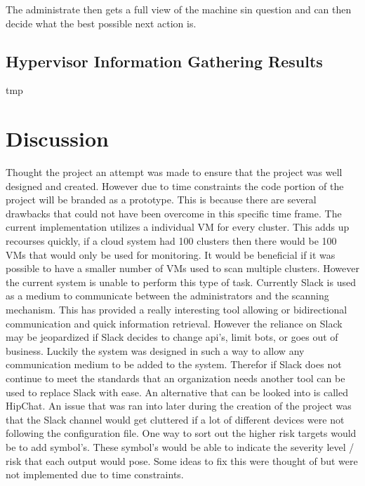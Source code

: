 \documentclass[12pt]{article}
\begin{document}
The administrate then gets a full view of the machine sin question and can then decide what the best possible next action is.

\subsection{Hypervisor Information Gathering Results}
tmp


\section{Discussion}
Thought the project an attempt was made to ensure that the project was well designed and created. However due to time constraints the code portion of the project will be branded as a prototype. This is because there are several drawbacks that could not have been overcome in this specific time frame. The current implementation utilizes a individual VM for every cluster. This adds up recourses quickly, if a cloud system had 100 clusters then there would be 100 VMs that would only be used for monitoring. It would be beneficial if it was possible to have a smaller number of VMs used to scan multiple clusters. However the current system is unable to perform this type of task. Currently Slack is used as a medium to communicate between the administrators and the scanning mechanism. This has provided a really interesting tool allowing or bidirectional communication and quick information retrieval. However the reliance on Slack may be jeopardized if Slack decides to change api's, limit bots, or goes out of business. Luckily the system was designed in such a way to allow any communication medium to be added to the system. Therefor if Slack does not continue to meet the standards that an organization needs another tool can be used to replace Slack with ease. An alternative that can be looked into is called HipChat.  An issue that was ran into later during the creation of the project was that the Slack channel would get cluttered if a lot of different devices were not following the configuration file. One way to sort out the higher risk targets would be to add symbol's. These symbol's would be able to indicate the severity level / risk that each output would pose. Some ideas to fix this were thought of but were not implemented due to time constraints.
\end{document}
